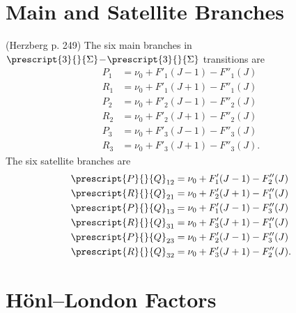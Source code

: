 \documentclass[11pt, twoside, fleqn]{report}
\newcommand{\dash}{\!-\!}
\newcommand{\state}[2]{\prescript{#1}{}{#2}}
\begin{document}
    \section{Main and Satellite Branches}

    (Herzberg p. 249) The six main branches in $\state{3}{\Sigma}\dash\state{3}{\Sigma}$ transitions are
    \begin{align*}
        P_{1} & = \nu_{0} + F'_{1}(J - 1) - F''_{1}(J)  \\
        R_{1} & = \nu_{0} + F'_{1}(J + 1) - F''_{1}(J)  \\
        P_{2} & = \nu_{0} + F'_{2}(J - 1) - F''_{2}(J)  \\
        R_{2} & = \nu_{0} + F'_{2}(J + 1) - F''_{2}(J)  \\
        P_{3} & = \nu_{0} + F'_{3}(J - 1) - F''_{3}(J)  \\
        R_{3} & = \nu_{0} + F'_{3}(J + 1) - F''_{3}(J).
    \end{align*}
    The six satellite branches are
    \begin{align*}
        \state{P}{Q}_{12} & = \nu_{0} + F'_{1}(J - 1) - F''_{2}(J)  \\
        \state{R}{Q}_{21} & = \nu_{0} + F'_{2}(J + 1) - F''_{1}(J)  \\
        \state{P}{Q}_{13} & = \nu_{0} + F'_{1}(J - 1) - F''_{3}(J)  \\
        \state{R}{Q}_{31} & = \nu_{0} + F'_{3}(J + 1) - F''_{1}(J)  \\
        \state{P}{Q}_{23} & = \nu_{0} + F'_{2}(J - 1) - F''_{3}(J)  \\
        \state{R}{Q}_{32} & = \nu_{0} + F'_{3}(J + 1) - F''_{2}(J).
    \end{align*}

    \section{H\"onl--London Factors}
\end{document}
